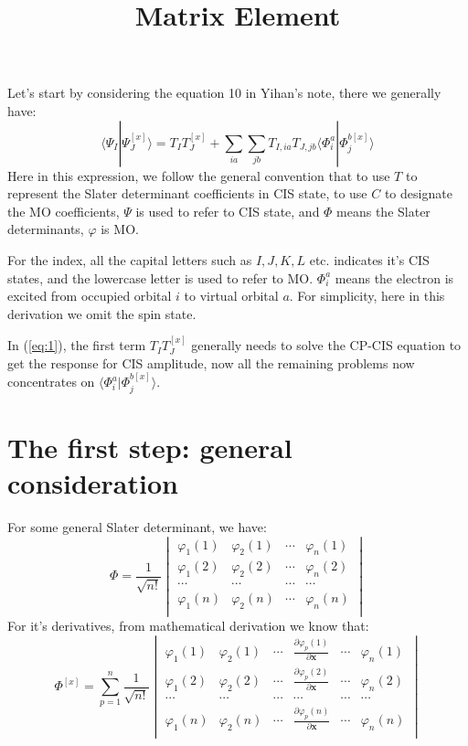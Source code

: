 \documentclass[a4paper,12pt]{article}
\title{Matrix Element}
\theoremstyle{definition}\newtheorem{law}{Law}
\theoremstyle{plain}\newtheorem{theorem}{Theorem}
\theoremstyle{remark}\newtheorem{remark}{Remark}
\theoremstyle{axiom}\newtheorem{axiom}{Axiom}
\begin{document}
\maketitle
Let's start by considering the equation 10 in Yihan's note, there we generally
have:
\begin{equation}
 \label{eq:1}
\langle\Psi_{I}|\Psi_{J}^{[x]}\rangle = T_{I}T_{J}^{[x]} +
\sum_{ia}\sum_{jb}T_{I,ia}T_{J,jb}\langle\Phi^{a}_{i}|\Phi^{b[x]}_{j}\rangle
\end{equation}
Here in this expression, we follow the general convention that to use $T$ to
represent the Slater determinant coefficients in CIS state, to use $C$ to
designate the MO coefficients, $\Psi$ is used to refer to CIS state, and $\Phi$
means the Slater determinants, $\varphi$ is MO.

For the index, all the capital letters such as $I,J,K,L$ etc. indicates it's
CIS states, and the lowercase letter is used to refer to MO. $\Phi^{a}_{i}$
means the electron is excited from occupied orbital $i$ to virtual orbital $a$.
For simplicity, here in this derivation we omit the spin state. 

In (\ref{eq:1}), the first term $T_{I}T_{J}^{[x]}$ generally needs to solve the
CP-CIS equation to get the response for CIS amplitude, now all the remaining
problems now concentrates on $\langle\Phi^{a}_{i}|\Phi^{b[x]}_{j}\rangle$.

\section{The first step: general consideration}
%
%
%
%
For some general Slater determinant, we have:
\begin{equation}
 \label{eq:2}
\Phi = \frac{1}{\sqrt{n!}}
\begin{vmatrix}
   \varphi_{1}(1) & \varphi_{2}(1) & \cdots & \varphi_{n}(1) \\
  \varphi_{1}(2) & \varphi_{2}(2) & \cdots & \varphi_{n}(2) \\
  \cdots & \cdots & \cdots & \cdots                                \\
  \varphi_{1}(n) & \varphi_{2}(n) & \cdots & \varphi_{n}(n) \\
\end{vmatrix}
\end{equation}
For it's derivatives, from mathematical derivation we know that:
\begin{equation}
 \label{eq:3}
\Phi^{[x]} = \sum_{p=1}^{n}\frac{1}{\sqrt{n!}}
\begin{vmatrix}
   \varphi_{1}(1) & \varphi_{2}(1) & \cdots & 
  \frac{\partial \varphi_{p}(1)}{\partial \bm{x}} &
   \cdots & \varphi_{n}(1) \\
   \varphi_{1}(2) & \varphi_{2}(2) & \cdots &
   \frac{\partial \varphi_{p}(2)}{\partial \bm{x}} &
   \cdots  & \varphi_{n}(2) \\
   \cdots & \cdots & \cdots & \cdots  & \cdots   & \cdots     \\
   \varphi_{1}(n) & \varphi_{2}(n) & \cdots & 
   \frac{\partial \varphi_{p}(n)}{\partial \bm{x}}  
   &\cdots & \varphi_{n}(n) \\
\end{vmatrix}
\end{equation}
\end{document}
